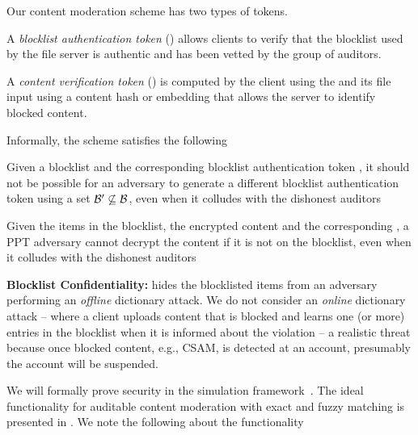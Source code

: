 Our content moderation scheme has two types of tokens. 

\enumListStart
\item A \emph{blocklist authentication token} (\blklistToken{\blocklist}) allows clients to verify that the blocklist \blocklist used by the file server is authentic and has been vetted by the group of auditors. 
\item A \emph{content verification token} (\contentToken{\clientData}) is computed by the client using the \blklistToken{\blocklist} and its file input \clientData using a content hash or embedding that allows the server to identify blocked content.
\enumListEnd



Informally, the scheme satisfies the following 

\enumListStart
	
	\item {} Given a blocklist \blocklist and the corresponding blocklist authentication token \blklistToken{\blocklist}, it should not be possible for an adversary to generate a different blocklist authentication token  using a set $\blocklist' \not \subseteq \blocklist$, even when it colludes with the dishonest auditors



	\item {}
	Given the items in the blocklist, the encrypted content and the corresponding \contentToken{\clientData}, a 
	PPT adversary cannot decrypt the content if it is not on the blocklist, even when it 
	colludes with the dishonest auditors 
	

	\item \textbf{Blocklist Confidentiality:} \blklistToken{\blocklist} hides the 
	blocklisted items from an adversary performing an \emph{offline} dictionary attack.  We do not consider an \emph{online} dictionary attack -- where a client uploads content that is blocked and learns one (or more) entries in the blocklist when it is informed about the violation -- a realistic threat because once blocked content, e.g., CSAM, is detected at an account, presumably the account will be suspended.
	
\enumListEnd



%
We will formally prove security in the simulation framework~\cite{lindell2017simulate}. The ideal functionality for auditable content moderation with exact and fuzzy matching is presented in . We note the following about the functionality



